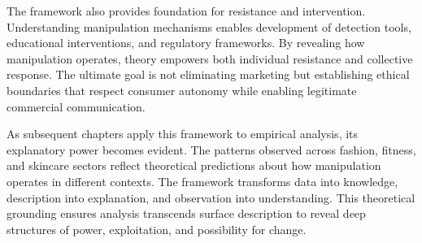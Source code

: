 The framework also provides foundation for resistance and intervention. Understanding manipulation mechanisms enables development of detection tools, educational interventions, and regulatory frameworks. By revealing how manipulation operates, theory empowers both individual resistance and collective response. The ultimate goal is not eliminating marketing but establishing ethical boundaries that respect consumer autonomy while enabling legitimate commercial communication.

As subsequent chapters apply this framework to empirical analysis, its explanatory power becomes evident. The patterns observed across fashion, fitness, and skincare sectors reflect theoretical predictions about how manipulation operates in different contexts. The framework transforms data into knowledge, description into explanation, and observation into understanding. This theoretical grounding ensures analysis transcends surface description to reveal deep structures of power, exploitation, and possibility for change.